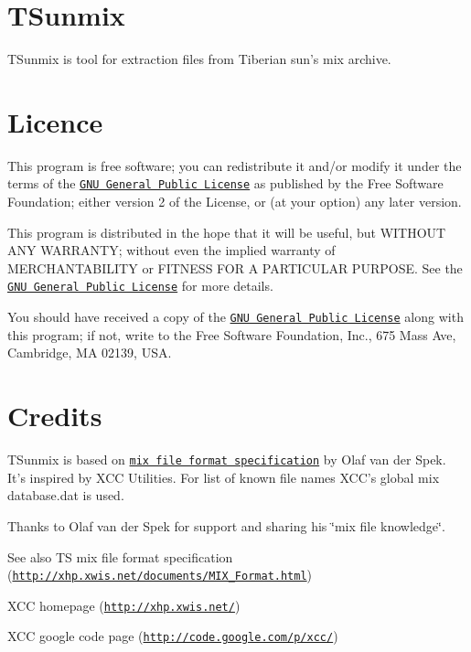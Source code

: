 \hypertarget{index_About}{}\section{TSunmix}\label{index_About}
TSunmix is tool for extraction files from Tiberian sun's mix archive.\hypertarget{index_Licence}{}\section{Licence}\label{index_Licence}
This program is free software; you can redistribute it and/or modify it under the terms of the \href{http://www.gnu.org/licenses/gpl.html}{\tt GNU General Public License} as published by the Free Software Foundation; either version 2 of the License, or (at your option) any later version.

This program is distributed in the hope that it will be useful, but WITHOUT ANY WARRANTY; without even the implied warranty of MERCHANTABILITY or FITNESS FOR A PARTICULAR PURPOSE. See the \href{http://www.gnu.org/licenses/gpl.html}{\tt GNU General Public License} for more details.

You should have received a copy of the \href{http://www.gnu.org/licenses/gpl.html}{\tt GNU General Public License} along with this program; if not, write to the Free Software Foundation, Inc., 675 Mass Ave, Cambridge, MA 02139, USA.\hypertarget{index_Credits}{}\section{Credits}\label{index_Credits}
TSunmix is based on \href{http://xhp.xwis.net/documents/MIX_Format.html}{\tt mix file format specification} by Olaf van der Spek. It's inspired by XCC Utilities. For list of known file names XCC's global mix database.dat is used.

Thanks to Olaf van der Spek for support and sharing his \char`\"{}mix file knowledge\char`\"{}.

\begin{DoxySeeAlso}{See also}
TS mix file format specification (\href{http://xhp.xwis.net/documents/MIX_Format.html}{\tt http://xhp.xwis.net/documents/MIX\_\-Format.html}) 

XCC homepage (\href{http://xhp.xwis.net/}{\tt http://xhp.xwis.net/}) 

XCC google code page (\href{http://code.google.com/p/xcc/}{\tt http://code.google.com/p/xcc/}) 
\end{DoxySeeAlso}
